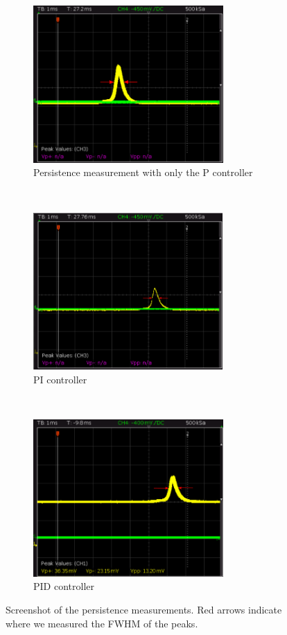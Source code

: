 \documentclass[a4paper,10pt]{article}
\begin{document}
\begin{figure}[H]
  \centering{}
  \begin{subfigure}[t]{0.45 \textwidth}
    \centering
    \includegraphics[height=6cm]{Pcontrolerpeak.png}
    \caption{Persistence measurement with only the P controller }
  \end{subfigure}
  ~
  \begin{subfigure}[t]{0.45 \textwidth}
    \centering
    \includegraphics[height=6cm]{PIcontrolerpeak.png}
    \caption{PI controller }
  \end{subfigure}
  ~
  \begin{subfigure}[t]{0.45 \textwidth}
    \centering
    \includegraphics[height=6cm]{PIDcontrolerpeak.png}
    \caption{PID controller }\label{PID}
  \end{subfigure}
  \caption{Screenshot of the persistence measurements. Red arrows indicate where we measured the FWHM of the peaks.}
  \label{fig_width_pid}
\end{figure}
\end{document}
